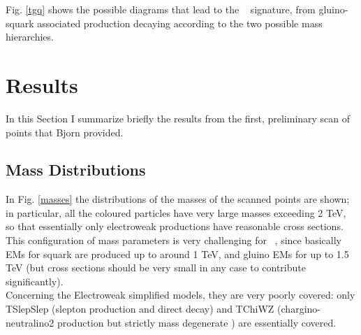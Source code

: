 \documentclass[a4paper,11pt]{article}
\begin{document}
Fig. \ref{tgq} shows the possible diagrams that lead to the \jmet~ signature, from gluino-squark associated production decaying according to the two possible mass hierarchies.


\clearpage
\section{Results}
In this Section I summarize briefly the results from the first, preliminary scan of points that Bjorn provided.
\subsection{Mass Distributions}
In Fig. \ref{masses} the distributions of the masses of the scanned points are shown; in particular, all the coloured particles have very large masses exceeding 2 TeV, so that essentially only electroweak productions have reasonable cross sections.
This configuration of mass parameters is very challenging for \SMO~, since basically EMs for squark are produced up to around 1 TeV, and gluino EMs for up to 1.5 TeV (but cross sections should be very small in any case to contribute significantly). 
\\
Concerning the Electroweak simplified models, they are very poorly covered: only TSlepSlep (slepton production and direct decay) and TChiWZ (chargino-neutralino2 production but strictly mass degenerate ) are essentially covered. 
\end{document}
